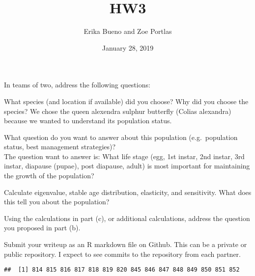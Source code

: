 \documentclass[]{article}
\title{HW3}
\author{Erika Bueno and Zoe Portlas}
\date{January 28, 2019}
\newenvironment{Shaded}{\begin{snugshade}}{\end{snugshade}}
\newcommand{\KeywordTok}[1]{\textcolor[rgb]{0.13,0.29,0.53}{\textbf{#1}}}
\newcommand{\DataTypeTok}[1]{\textcolor[rgb]{0.13,0.29,0.53}{#1}}
\newcommand{\DecValTok}[1]{\textcolor[rgb]{0.00,0.00,0.81}{#1}}
\newcommand{\StringTok}[1]{\textcolor[rgb]{0.31,0.60,0.02}{#1}}
\newcommand{\CommentTok}[1]{\textcolor[rgb]{0.56,0.35,0.01}{\textit{#1}}}
\newcommand{\OperatorTok}[1]{\textcolor[rgb]{0.81,0.36,0.00}{\textbf{#1}}}
\newcommand{\NormalTok}[1]{#1}
\begin{document}
\maketitle

In teams of two, address the following questions:

What species (and location if available) did you choose? Why did you
choose the species? We chose the queen alexendra sulphur butterfly
(Colias alexandra) because we wanted to understand its population
status.

What question do you want to answer about this population
(e.g.~population status, best management strategies)?\\
The question want to answer is: What life stage (egg, 1st instar, 2nd
instar, 3rd instar, diapause (pupae), post diapause, adult) is most
important for maintaining the growth of the population?

Calculate eigenvalue, stable age distribution, elasticity, and
sensitivity. What does this tell you about the population?

Using the calculations in part (c), or additional calculations, address
the question you proposed in part (b).

Submit your writeup as an R markdown file on Github. This can be a
private or public repository. I expect to see commits to the repository
from each partner.

\begin{Shaded}
\end{Shaded}

\begin{verbatim}
##  [1] 814 815 816 817 818 819 820 845 846 847 848 849 850 851 852
\end{verbatim}

\begin{Shaded}
\end{Shaded}
\end{document}
